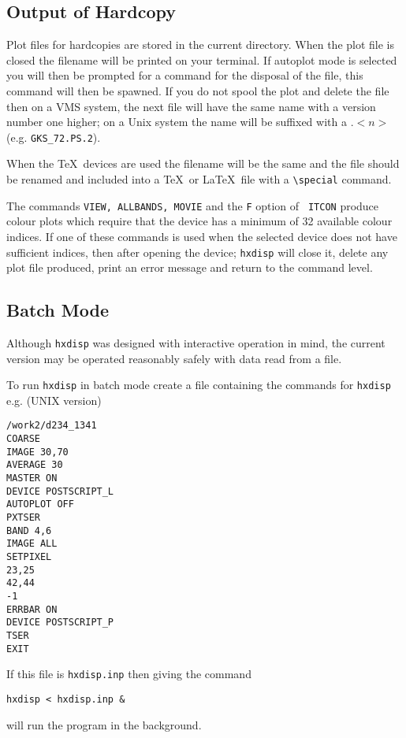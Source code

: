 \subsection{Output of Hardcopy}

Plot files for hardcopies are stored in the current directory. When the
plot file is closed the filename will be printed on your terminal.  If
autoplot mode is selected you will then be prompted for a command for
the disposal of the file, this command will then be spawned.  If you do
not spool the plot and delete the file then on a VMS system, the next
file will have the same name with a version number one higher; on a
Unix system the name will be suffixed with a $.<n>$ (e.g.
\verb!GKS_72.PS.2!).

When the \TeX\ devices are used the filename will be the same and the
file should be renamed and included into a \TeX\ or \LaTeX\ file with a
\verb!\special! command.

The commands {\tt VIEW, ALLBANDS, MOVIE} and the {\tt F} option of {\tt
ITCON} produce colour plots which require that the device has a minimum
of 32 available colour indices. If one of these commands is used when
the selected device does not have sufficient indices, then after
opening the device; \verb!hxdisp! will close it, delete any plot file
produced, print an error message and return to the command level.

\subsection{Batch Mode}

Although \verb!hxdisp! was designed with interactive operation in mind,
the current version may be operated reasonably safely with data read
from a file.

To run \verb!hxdisp! in batch mode create a file containing the
commands for
\verb!hxdisp! e.g. (UNIX version)

\begin{verbatim}
/work2/d234_1341
COARSE
IMAGE 30,70
AVERAGE 30
MASTER ON
DEVICE POSTSCRIPT_L
AUTOPLOT OFF
PXTSER
BAND 4,6
IMAGE ALL
SETPIXEL
23,25
42,44
-1
ERRBAR ON
DEVICE POSTSCRIPT_P
TSER
EXIT
\end{verbatim}

If this file is \verb!hxdisp.inp! then giving the command
\begin{verbatim}
hxdisp < hxdisp.inp &
\end{verbatim}
will run the program in the background.

